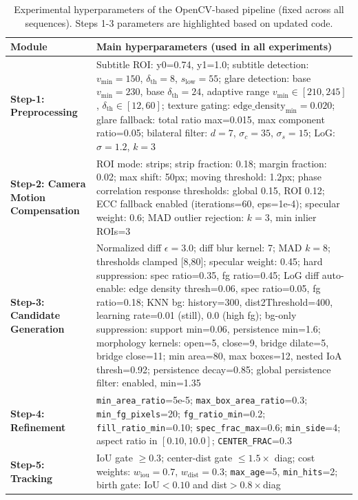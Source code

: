 \begin{table}[t]
\centering
\small
\setlength{\tabcolsep}{4pt}
\renewcommand{\arraystretch}{1.05}
\begin{tabular}{p{}|p{}}
\hline
\textbf{Module} & \textbf{Main hyperparameters (used in all experiments)}\\
\hline
\textbf{Step-1: Preprocessing} &
Subtitle ROI: y0=0.74, y1=1.0; subtitle detection: $v_{\min}=150$, $\delta_{\text{th}}=8$, $s_{\text{low}}=55$; glare detection: base $v_{\min}=230$, base $\delta_{\text{th}}=24$, adaptive range $v_{\min}\in[210,245]$, $\delta_{\text{th}}\in[12,60]$; texture gating: $\text{edge\_density}_{\min}=0.020$; glare fallback: total ratio max=0.015, max component ratio=0.05; bilateral filter: $d=7$, $\sigma_c=35$, $\sigma_s=15$; LoG: $\sigma=1.2$, $k=3$ \\
\hline
\textbf{Step-2: Camera Motion Compensation} &
ROI mode: strips; strip fraction: 0.18; margin fraction: 0.02; max shift: 50px; moving threshold: 1.2px; phase correlation response thresholds: global 0.15, ROI 0.12; ECC fallback enabled (iterations=60, eps=1e-4); specular weight: 0.6; MAD outlier rejection: $k=3$, min inlier ROIs=3 \\
\hline
\textbf{Step-3: Candidate Generation} &
Normalized diff $\epsilon=3.0$; diff blur kernel: 7; MAD $k=8$; thresholds clamped [8,80]; specular weight: 0.45; hard suppression: spec ratio=0.35, fg ratio=0.45; LoG diff auto-enable: edge density thresh=0.06, spec ratio=0.05, fg ratio=0.18; KNN bg: history=300, dist2Threshold=400, learning rate=0.01 (still), 0.0 (high fg); bg-only suppression: support min=0.06, persistence min=1.6; morphology kernels: open=5, close=9, bridge dilate=5, bridge close=11; min area=80, max boxes=12, nested IoA thresh=0.92; persistence decay=0.85; global persistence filter: enabled, min=1.35 \\
\hline
\textbf{Step-4: Refinement} &
\texttt{min\_area\_ratio}=5e{-}5; \texttt{max\_box\_area\_ratio}=0.3; \texttt{min\_fg\_pixels}=20; \texttt{fg\_ratio\_min}=0.2; \texttt{fill\_ratio\_min}=0.10; \texttt{spec\_frac\_max}=0.6; \texttt{min\_side}=4; aspect ratio in $[0.10,10.0]$; \texttt{CENTER\_FRAC}=0.3 \\
\hline
\textbf{Step-5: Tracking} &
IoU gate $\ge 0.3$; center-dist gate $\le 1.5 \times$ diag; cost weights: $w_\text{iou}=0.7$, $w_\text{dist}=0.3$; \texttt{max\_age}=5, \texttt{min\_hits}=2; birth gate: IoU$<0.10$ and dist$>0.8\times$diag \\
\hline
\end{tabular}
\caption{Experimental hyperparameters of the OpenCV-based pipeline (fixed across all sequences). Steps 1-3 parameters are highlighted based on updated code.}
\label{tab:opencv_settings}
\end{table}

